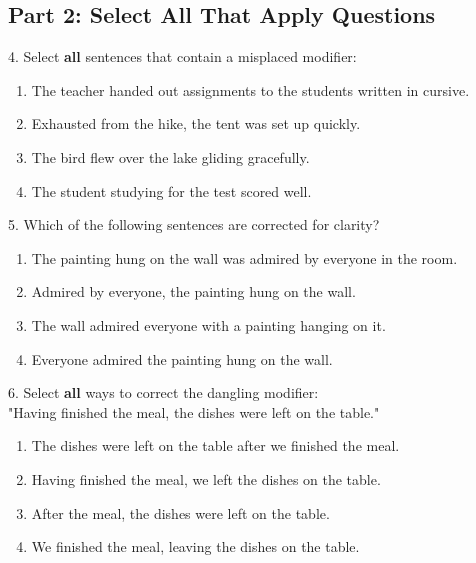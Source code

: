 \documentclass[12pt]{article}
\begin{document}
\vspace{1cm}

\subsection*{Part 2: Select All That Apply Questions}

4. Select \textbf{all} sentences that contain a misplaced modifier:  
\begin{enumerate}[label=\Alph*.]
    \item The teacher handed out assignments to the students written in cursive.  
    \item Exhausted from the hike, the tent was set up quickly.  
    \item The bird flew over the lake gliding gracefully.  
    \item The student studying for the test scored well.  
\end{enumerate}

\vspace{1cm}

5. Which of the following sentences are corrected for clarity?  
\begin{enumerate}[label=\Alph*.]
    \item The painting hung on the wall was admired by everyone in the room.  
    \item Admired by everyone, the painting hung on the wall.  
    \item The wall admired everyone with a painting hanging on it.  
    \item Everyone admired the painting hung on the wall.  
\end{enumerate}

\vspace{1cm}

6. Select \textbf{all} ways to correct the dangling modifier: \\  
"Having finished the meal, the dishes were left on the table."  
\begin{enumerate}[label=\Alph*.]
    \item The dishes were left on the table after we finished the meal.  
    \item Having finished the meal, we left the dishes on the table.  
    \item After the meal, the dishes were left on the table.  
    \item We finished the meal, leaving the dishes on the table.  
\end{enumerate}
\end{document}
